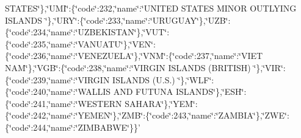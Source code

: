 \begin{DoxyCompactItemize}
S\-T\-A\-T\-E\-S\char`\"{}\},\char`\"{}U\-M\-I\char`\"{}\-:\{\char`\"{}code\char`\"{}\-:232,\char`\"{}name\char`\"{}\-:\char`\"{}U\-N\-I\-T\-E\-D S\-T\-A\-T\-E\-S M\-I\-N\-O\-R O\-U\-T\-L\-Y\-I\-N\-G I\-S\-L\-A\-N\-D\-S \char`\"{}\},\char`\"{}U\-R\-Y\char`\"{}\-:\{\char`\"{}code\char`\"{}\-:233,\char`\"{}name\char`\"{}\-:\char`\"{}U\-R\-U\-G\-U\-A\-Y\char`\"{}\},\char`\"{}U\-Z\-B\char`\"{}\-:\{\char`\"{}code\char`\"{}\-:234,\char`\"{}name\char`\"{}\-:\char`\"{}U\-Z\-B\-E\-K\-I\-S\-T\-A\-N\char`\"{}\},\char`\"{}V\-U\-T\char`\"{}\-:\{\char`\"{}code\char`\"{}\-:235,\char`\"{}name\char`\"{}\-:\char`\"{}V\-A\-N\-U\-A\-T\-U\char`\"{}\},\char`\"{}V\-E\-N\char`\"{}\-:\{\char`\"{}code\char`\"{}\-:236,\char`\"{}name\char`\"{}\-:\char`\"{}V\-E\-N\-E\-Z\-U\-E\-L\-A\char`\"{}\},\char`\"{}V\-N\-M\char`\"{}\-:\{\char`\"{}code\char`\"{}\-:237,\char`\"{}name\char`\"{}\-:\char`\"{}V\-I\-E\-T N\-A\-M\char`\"{}\},\char`\"{}V\-G\-B\char`\"{}\-:\{\char`\"{}code\char`\"{}\-:238,\char`\"{}name\char`\"{}\-:\char`\"{}V\-I\-R\-G\-I\-N I\-S\-L\-A\-N\-D\-S (B\-R\-I\-T\-I\-S\-H) \char`\"{}\},\char`\"{}V\-I\-R\char`\"{}\-:\{\char`\"{}code\char`\"{}\-:239,\char`\"{}name\char`\"{}\-:\char`\"{}V\-I\-R\-G\-I\-N I\-S\-L\-A\-N\-D\-S (U.\-S.) \char`\"{}\},\char`\"{}W\-L\-F\char`\"{}\-:\{\char`\"{}code\char`\"{}\-:240,\char`\"{}name\char`\"{}\-:\char`\"{}W\-A\-L\-L\-I\-S A\-N\-D F\-U\-T\-U\-N\-A I\-S\-L\-A\-N\-D\-S\char`\"{}\},\char`\"{}E\-S\-H\char`\"{}\-:\{\char`\"{}code\char`\"{}\-:241,\char`\"{}name\char`\"{}\-:\char`\"{}W\-E\-S\-T\-E\-R\-N S\-A\-H\-A\-R\-A\char`\"{}\},\char`\"{}Y\-E\-M\char`\"{}\-:\{\char`\"{}code\char`\"{}\-:242,\char`\"{}name\char`\"{}\-:\char`\"{}Y\-E\-M\-E\-N\char`\"{}\},\char`\"{}Z\-M\-B\char`\"{}\-:\{\char`\"{}code\char`\"{}\-:243,\char`\"{}name\char`\"{}\-:\char`\"{}Z\-A\-M\-B\-I\-A\char`\"{}\},\char`\"{}Z\-W\-E\char`\"{}\-:\{\char`\"{}code\char`\"{}\-:244,\char`\"{}name\char`\"{}\-:\char`\"{}Z\-I\-M\-B\-A\-B\-W\-E\char`\"{}\}\}'
\item 

\end{DoxyCompactItemize}
